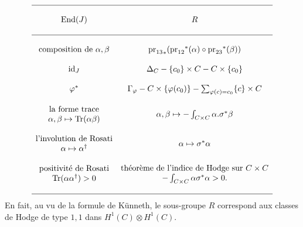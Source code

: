 $$
\begin{matrix}
\hline & \\
\text{End}(J) & R \\
& \\
\hline & \\
\text{composition de }\alpha, \beta &
{\text{pr}_{13}}_* ({\text{pr}_{12}}^*(\alpha) \circ {\text{pr}_{23}}^*(\beta))
\\
& \\
\text{id}_J &
\Delta_C - \{c_0\} \times C - C \times \{c_0\} \\
& \\
\varphi^* &
\Gamma_\varphi - C \times \{\varphi(c_0)\}
- \sum_{\varphi(c) = c_0} \{c\} \times C \\
& \\
{
\begin{matrix}
\text{la forme trace} \\
\alpha, \beta \mapsto \text{Tr}(\alpha \beta)
\end{matrix}
}
&
\alpha, \beta \mapsto - \int_{C \times C} \alpha . \sigma^*\beta
\\
& \\
{
\begin{matrix}
\text{l'involution de Rosati} \\
\alpha \mapsto \alpha^\dagger
\end{matrix}
}
&
\alpha \mapsto \sigma^*\alpha
\\
& \\
{
\begin{matrix}
\text{positivité de Rosati} \\
\text{Tr}(\alpha\alpha^\dagger) > 0
\end{matrix}
}
&
{
\begin{matrix}
\text{théorème de l'indice de Hodge sur }C \times C \\
- \int_{C \times C} \alpha \sigma^*\alpha > 0.
\end{matrix}
}
\\
& \\
\hline 
\end{matrix}
$$
En fait, au vu de la formule de Künneth, le sous-groupe $R$ correspond aux classes de Hodge de type
$1, 1$ dans $H^1(C)\otimes H^1(C)$.

